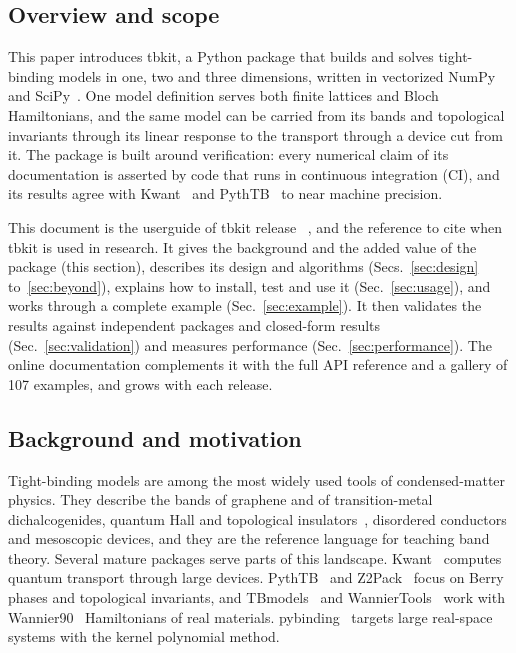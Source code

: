 \documentclass[submission, Phys]{SciPost}
\begin{document}
\subsection{Overview and scope}

This paper introduces tbkit, a Python package that builds and solves
tight-binding models in one, two and three dimensions, written in
vectorized NumPy~\cite{numpy} and SciPy~\cite{scipy}. One model definition
serves both finite lattices and Bloch Hamiltonians, and the same model
can be carried from its bands and topological invariants through its
linear response to the transport through a device cut from it. The
package is built around verification: every numerical claim of its
documentation is asserted by code that runs in continuous integration
(CI), and its results agree with Kwant~\cite{groth2014} and
PythTB~\cite{pythtb} to near machine precision.

This document is the userguide of tbkit release
\tbkitversion~\cite{tbkit062}, and the reference to cite when tbkit is
used in research. It gives the background and the added value of the
package (this section), describes its design and algorithms
(Secs.~\ref{sec:design} to~\ref{sec:beyond}), explains how to install,
test and use it (Sec.~\ref{sec:usage}), and works through a complete
example (Sec.~\ref{sec:example}). It then validates the results against
independent packages and closed-form results (Sec.~\ref{sec:validation})
and measures performance (Sec.~\ref{sec:performance}). The online
documentation complements it with the full API reference and a gallery of
107 examples, and grows with each release.

\subsection{Background and motivation}

Tight-binding models are among the most widely used tools of condensed-matter physics. They
describe the bands of graphene and of transition-metal dichalcogenides,
quantum Hall and topological insulators~\cite{tknn1982,hasan2010}, disordered conductors and
mesoscopic devices, and they are the reference language for teaching band
theory. Several mature packages serve parts of this landscape.
Kwant~\cite{groth2014} computes quantum transport through large devices.
PythTB~\cite{pythtb} and Z2Pack~\cite{gresch2017} focus on Berry phases and
topological invariants, and TBmodels~\cite{gresch2018} and
WannierTools~\cite{wu2018} work with Wannier90~\cite{pizzi2020}
Hamiltonians of real materials. pybinding~\cite{pybinding} targets large
real-space systems with the kernel polynomial method.
\end{document}
